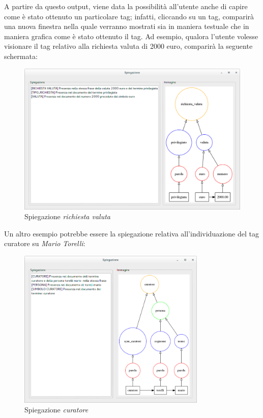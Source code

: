 A partire da questo output, viene data la possibilità all'utente anche di capire come è stato ottenuto un particolare tag; infatti, cliccando su un tag, comparirà una nuova finestra nella quale verranno mostrati sia in maniera testuale che in maniera grafica come è stato ottenuto il tag.
Ad esempio, qualora l'utente volesse visionare il tag relativo alla richiesta valuta di 2000 euro, comparirà la seguente schermata:

\begin{figure}[H]
	\centering
	\includegraphics[width=1.1\textwidth]{img/interfaces/java-richiestavaluta.png}
	\caption[Schermata java explain richiesta valuta]{Spiegazione \emph{richiesta valuta}}
	\label{java-richiestavaluta}
\end{figure}

Un altro esempio potrebbe essere la spiegazione relativa all'individuazione del tag curatore su \emph{Mario Torelli}:

\begin{figure}[H]
	\centering
	\includegraphics[width=0.8\textwidth]{img/interfaces/java-curatore.png}
	\caption[Schermata java explain curatore]{Spiegazione \emph{curatore}}
	\label{java-curatore}
\end{figure}


